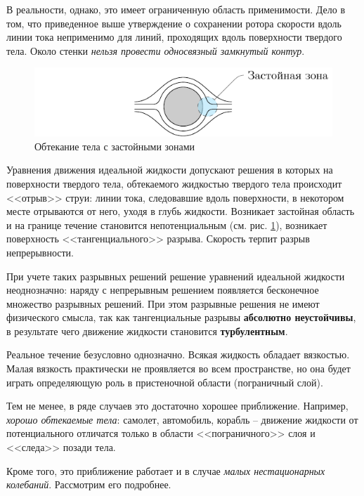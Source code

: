 В реальности, однако, это имеет ограниченную область применимости. Дело в том, что приведенное выше утверждение о сохранении ротора скорости вдоль линии тока неприменимо для линий, проходящих вдоль поверхности твердого тела. Около стенки \textit{нельзя провести односвязный замкнутый контур}. 
\begin{figure}[H]
	\centering
	\includegraphics[scale=1.5]{img/tang}
	\caption{Обтекание тела с застойными зонами}
	\label{fig:figure14}
\end{figure}
Уравнения движения идеальной жидкости допускают решения в которых на поверхности твердого тела, обтекаемого жидкостью твердого тела происходит <<отрыв>> струи: линии тока, следовавшие вдоль поверхности, в некотором месте отрываются от него, уходя в глубь жидкости. Возникает застойная область и на границе течение становится непотенциальным (см. рис. \ref{fig:figure14}), возникает поверхность <<тангенциального>> разрыва. Скорость терпит разрыв непрерывности.


При учете таких разрывных решений решение уравнений идеальной жидкости неоднозначно: наряду с непрерывным решением появляется бесконечное множество разрывных решений. При этом разрывные решения не имеют физического смысла, так как тангенциальные разрывы \textbf{абсолютно неустойчивы}, в результате чего движение жидкости становится \textbf{турбулентным}.

Реальное течение безусловно однозначно. Всякая жидкость обладает вязкостью. Малая вязкость практически не проявляется во всем пространстве, но она будет играть определяющую роль в пристеночной области (пограничный слой).

Тем не менее, в ряде случаев это достаточно хорошее приближение.  Например, \textit{хорошо обтекаемые тела}: самолет, автомобиль, корабль -- движение жидкости от потенциального отличатся только в области <<пограничного>> слоя и <<следа>> позади тела.

Кроме того, это приближение работает и в случае \textit{малых нестационарных колебаний}. Рассмотрим его подробнее.


